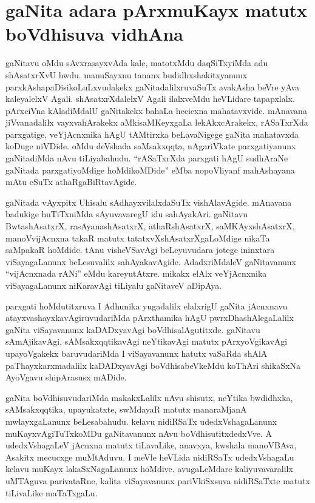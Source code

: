 \chapter{gaNita adara pArxmuKayx matutx boVdhisuva vidhAna}

gaNitavu oMdu sAvxrasayxvAda kale, matotxMdu daqSiTxyiMda adu shAsatxrXvU hwdu. manuSayxnu tananx budidhxshakitxyanunx parxkAshapaDisikoLuLxvudakekx gaNitadalilxruvaSuTx avakAsha beVre yAva kaleyalelxV Agali. shAsatxrXdalelxV Agali ilalxveMdu heVLidare tapapxlalx. pArxciVna kAladiMdalU gaNitakekx bahaLa hecicxna mahatavxvide. mAnavana jiVvanadalilx vayxvahArakekx aMkisaMKeyxgaLa lekAkxcArakekx, rASaTxrXda parxgatige, veYjAcnxnika hAgU tAMtirxka beLavaNigege gaNita mahatavxda koDuge niVDide. oMdu deVshada saMsakxqqta, nAgariVkate parxgatiyanunx gaNitadiMda nAvu tiLiyabahudu. ``rASaTxrXda parxgati hAgU sudhAraNe gaNitada parxgatiyoMdige hoMdikoMDide'' eMba nopoVliyanf mahAshayana mAtu eSuTx athaRgaBiRtavAgide.

gaNitada vAyxpitx Uhisalu sAdhayxvilalxdaSuTx vishAlavAgide. mAnavana badukige huTiTxniMda sAyuvavaregU idu sahAyakAri. gaNitavu BwtashAsatxrX, rasAyanashAsatxrX, athaRshAsatxrX, saMKAyxshAsatxrX, manoVvijAcnxna takaR matutx tatatxvXshAsatxrXgaLoMdige nikaTa saMpakaR hoMdide. tAnu visheVSavAgi beLeyuvudara jotege ininxtara viSayagaLanunx beLesuvalilx sahAyakavAgide. AdadxriMdaleV gaNitavanunx ``vijAcnxnada rANi'' eMdu kareyutAtxre. mikakx elAlx veYjAcnxnika viSayagaLanunx niKaravAgi tiLiyalu gaNitaveV aDipAya.

parxgati hoMdutitxruva I Adhunika yugadalilx elalxrigU gaNita jAcnxnavu atayxvashayxkavAgiruvudariMda pArxthamika hAgU pwrxDhashAlegaLalilx gaNita viSayavanunx kaDADxyavAgi boVdhisalAgutitxde. gaNitavu sAmAjikavAgi, sAMsakxqqtikavAgi neYtikavAgi matutx pArxyoVgikavAgi upayoVgakekx baruvudariMda I viSayavanunx hatutx vaSaRda shAlA paThayxkarxmadalilx kaDADxyavAgi boVdhisabeVkeMdu koThAri shikaSxNa AyoVgavu shipArasusx mADide.

gaNita boVdhisuvudariMda makakxLalilx nAvu shisutx, neYtika bwdidhxka, sAMsakxqqtika, upayukatxte, swMdayaR matutx manaraMjanA mwlayxgaLanunx beLesabahudu. kelavu nidiRSaTx udedxVshagaLanunx muKayxvAgiTuTxkoMDu gaNitavanunx nAvu boVdhisutitxdedxVve. A udedxVshagaLeV jAcnxna matutx tiLavaLike, anavxya, kwshala manoVBAva, Asakitx mecucxge muMtAduvu. I meVle heVLida nidiRSaTx udedxVshagaLu kelavu muKayx lakaSxNagaLanunx hoMdive. avugaLeMdare kaliyuvavaralilx uMTAguva parivataRne, kalita viSayavanunx pariVkiSxsuva nidiRSaTxte matutx tiLivaLike maTaTxgaLu.

